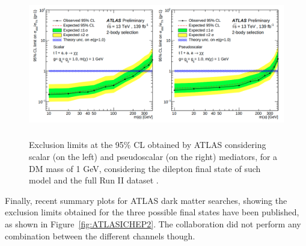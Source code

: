 \documentclass[a4paper, 10pt, openright]{report}
\begin{document}
 \begin{figure}[htbp]
\centering
\includegraphics[width=15cm, height=6.4cm]{figs/ATLASICHEP.png}
\caption{Exclusion limits at the 95\% \ac{CL} obtained by \ac{ATLAS} considering  scalar (on the left) and pseudoscalar (on the right) mediators, for a \ac{DM} mass of 1 GeV, considering the dilepton final state of such model and the full Run II dataset \cite{PreviousDoubleTopBottomAllLep13ATLAS}.}\label{fig:ATLASICHEP}
\end{figure}

Finally, recent summary plots for ATLAS dark matter searches, showing the exclusion limits obtained for the three possible final states have been published, as shown in Figure~\ref{fig:ATLASICHEP2}. The collaboration did not perform any combination between the different channels though.
\end{document}
